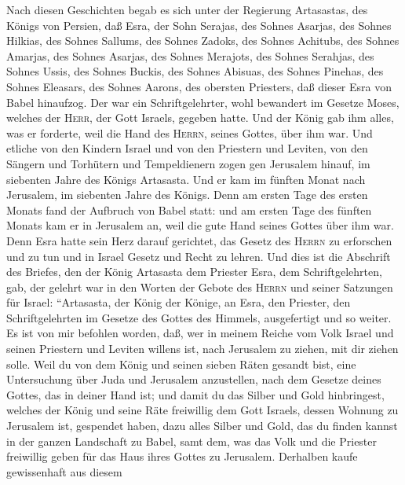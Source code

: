  Nach diesen Geschichten begab es sich unter der Regierung
Artasastas, des Königs von Persien, daß Esra, der Sohn Serajas, des
Sohnes Asarjas, des Sohnes Hilkias,  des Sohnes Sallums,
des Sohnes Zadoks, des Sohnes Achitubs,  des Sohnes
Amarjas, des Sohnes Asarjas, des Sohnes Merajots,  des
Sohnes Serahjas, des Sohnes Ussis, des Sohnes Buckis,  des
Sohnes Abisuas, des Sohnes Pinehas, des Sohnes Eleasars, des Sohnes
Aarons, des obersten Priesters,  daß dieser Esra von Babel
hinaufzog. Der war ein Schriftgelehrter, wohl bewandert im Gesetze
Moses, welches der \textsc{Herr}, der Gott Israels, gegeben hatte. Und
der König gab ihm alles, was er forderte, weil die Hand des
\textsc{Herrn}, seines Gottes, über ihm war.  Und etliche
von den Kindern Israel und von den Priestern und Leviten, von den
Sängern und Torhütern und Tempeldienern zogen gen Jerusalem hinauf, im
siebenten Jahre des Königs Artasasta.  Und er kam im
fünften Monat nach Jerusalem, im siebenten Jahre des Königs.
 Denn am ersten Tage des ersten Monats fand der Aufbruch
von Babel statt: und am ersten Tage des fünften Monats kam er in
Jerusalem an, weil die gute Hand seines Gottes über ihm war.
 Denn Esra hatte sein Herz darauf gerichtet, das Gesetz
des \textsc{Herrn} zu erforschen und zu tun und in Israel Gesetz und
Recht zu lehren.  Und dies ist die Abschrift des Briefes,
den der König Artasasta dem Priester Esra, dem Schriftgelehrten, gab,
der gelehrt war in den Worten der Gebote des \textsc{Herrn} und seiner
Satzungen für Israel:  ``Artasasta, der König der Könige,
an Esra, den Priester, den Schriftgelehrten im Gesetze des Gottes des
Himmels, ausgefertigt und so weiter.  Es ist von mir
befohlen worden, daß, wer in meinem Reiche vom Volk Israel und seinen
Priestern und Leviten willens ist, nach Jerusalem zu ziehen, mit dir
ziehen solle.  Weil du von dem König und seinen sieben
Räten gesandt bist, eine Untersuchung über Juda und Jerusalem
anzustellen, nach dem Gesetze deines Gottes, das in deiner Hand ist;
 und damit du das Silber und Gold hinbringest, welches
der König und seine Räte freiwillig dem Gott Israels, dessen Wohnung zu
Jerusalem ist, gespendet haben,  dazu alles Silber und
Gold, das du finden kannst in der ganzen Landschaft zu Babel, samt dem,
was das Volk und die Priester freiwillig geben für das Haus ihres Gottes
zu Jerusalem.  Derhalben kaufe gewissenhaft aus diesem
